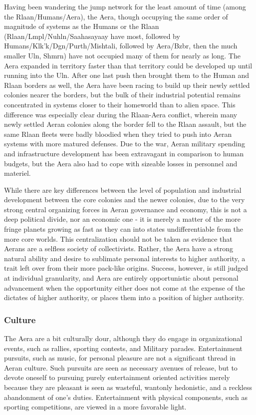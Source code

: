 Having been wandering the jump network for the least amount of time
(among the Rlaan/Humans/Aera), the Aera, though occupying the same
order of magnitude of systems as the Humans or the Rlaan
(Rlaan/Lmpl/Nuhln/Saahasayaay have most, followed by
Humans/Klk'k/Dgn/Purth/Mishtali, followed by Aera/Bzbr, then the much
smaller Uln, Shmrn) have not occupied many of them for nearly as
long. The Aera expanded in territory faster than that territory could
be developed up until running into the Uln. After one last push then
brought them to the Human and Rlaan borders as well, the Aera have
been racing to build up their newly settled colonies nearer the
borders, but the bulk of their industrial potential remains
concentrated in systems closer to their homeworld than to alien
space. This difference was especially clear during the Rlaan-Aera
conflict, wherein many newly settled Aeran colonies along the border
fell to the Rlaan assault, but the same Rlaan fleets were badly
bloodied when they tried to push into Aeran systems with more matured
defenses. Due to the war, Aeran military spending and infrastructure
development has been extravagant in comparison to human budgets, but
the Aera also had to cope with sizeable losses in personnel and
materiel.

While there are key differences between the level of population and
industrial development between the core colonies and the newer
colonies, due to the very strong central organizing forces in Aeran
governance and economy, this is not a deep political divide, nor an
economic one - it is merely a matter of the more fringe planets
growing as fast as they can into states undifferentiable from the more
core worlds. This centralization should not be taken as evidence that
Aerans are a selfless society of collectivists. Rather, the Aera have
a strong natural ability and desire to sublimate personal interests to
higher authority, a trait left over from their more pack-like
origins. Success, however, is still judged at individual granularity,
and Aera are entirely opportunistic about personal advancement when
the opportunity either does not come at the expense of the dictates of
higher authority, or places them into a position of higher authority.

\subsubsection{Culture}
The Aera are a bit culturally dour, although they do engage in
organizational events, such as rallies, sporting contests, and
Military parades. Entertainment pursuits, such as music, for personal
pleasure are not a significant thread in Aeran culture. Such pursuits
are seen as necessary avenues of release, but to devote oneself to
pursuing purely entertainment oriented activities merely because they
are pleasant is seen as wasteful, wantonly hedonistic, and a reckless
abandonment of one's duties. Entertainment with physical components,
such as sporting competitions, are viewed in a more favorable light.

